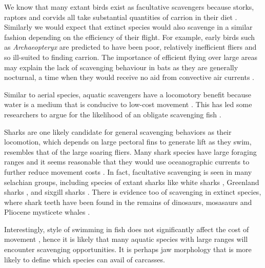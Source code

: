 \documentclass[a4paper,12pt]{article}
\begin{document}
We know that many extant birds exist as facultative scavengers because storks, raptors and corvids all take substantial quantities of carrion in their diet \citep{kendall2013alternative}. 
Similarly we would expect that extinct species would also scavenge in a similar fashion depending on the efficiency of their flight. 
For example, early birds such as \textit{Archaeopteryx} are predicted to have been poor, relatively inefficient fliers \citep{nudds2010narrow} and so ill-suited to finding carrion. 
The importance of efficient flying over large areas may explain the lack of scavenging behaviour in bats as they are generally nocturnal, a time when they would receive no aid from convective air currents \citep{norberg2012vertebrate}. 

Similar to aerial species, aquatic scavengers have a locomotory benefit because water is a medium that is conducive to low-cost movement \citep{tucker1975energetic,williams1999evolution}.
This has led some researchers to argue for the likelihood of an obligate scavenging fish \citep{ruxton2004energetic,ruxton2005searching}. 

Sharks are one likely candidate for general scavenging behaviors as their locomotion, which depends on large pectoral fins to generate lift as they swim, resembles that of the large soaring fliers.
Many shark species have large foraging ranges \citep[e.g. the great white sharks \textit{Carcharodon carcharias};][]{bruce2006movements} and it seems reasonable that they would use oceanographic currents to further reduce movement costs \citep{ruxton2004energetic}.
In fact, facultative scavenging is seen in many selachian groups, including species of extant sharks like white sharks \citep[known to feed on whale carcasses;][]{fallows2013white}, Greenland sharks \citep[feeding on seals;][]{watanabe2012slowest}, and sixgill sharks \citep{anderson2016impact}. 
There is evidence too of scavenging in extinct species, where shark teeth have been found in the remains of dinosaurs, mosasaurs and Pliocene mysticete whales \citep[5.3-3.6 Mya; ][]{schwimmer1997scavenging,ehret2009caught}. 

Interestingly, style of swimming in fish does not significantly affect the cost of movement \citep{williams1999evolution}, hence it is likely that many aquatic species with large ranges will encounter scavenging opportunities. 
It is perhaps jaw morphology that is more likely to define which species can avail of carcasses.
\end{document}
